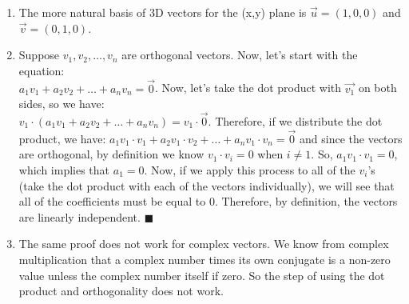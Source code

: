 \documentclass{article}
\newcommand*{\qed}{\hfill\ensuremath{\blacksquare}}
\begin{document}
\begin{enumerate}
\item The more natural basis of 3D vectors for the (x,y) plane is $\overrightarrow{u} = (1, 0, 0)$ and $\overrightarrow{v} = (0, 1, 0)$. 

\item Suppose $v_1, v_2, \dots, v_n$ are orthogonal vectors. Now, let's start with the equation:\\
$a_1v_1 + a_2v_2 + \dots + a_nv_n = \overrightarrow{0}$. Now, let's take the dot product with $\overrightarrow{v_1}$ on both sides, so we have:\\
$v_1 \cdot (a_1v_1 + a_2v_2 + \dots + a_nv_n) = v_1 \cdot \overrightarrow{0}$. Therefore, if we distribute the dot product, we have:
$a_1v_1 \cdot v_1 + a_2v_1 \cdot v_2 + \dots + a_nv_1 \cdot v_n = \overrightarrow{0}$
and since the vectors are orthogonal, by definition we know $v_1 \cdot v_i = 0$ when $i \neq 1$. So, $a_1 v_1 \cdot v_1 = 0$, which implies that $a_1 = 0$. Now, if we apply this process to all of the $v_i$'s (take the dot product with each of the vectors individually), we will see that all of the coefficients must be equal to 0. Therefore, by definition, the vectors are linearly independent. \qed

\item The same proof does not work for complex vectors. We know from complex multiplication that a complex number times its own conjugate is a non-zero value unless the complex number itself if zero. So the step of using the dot product and orthogonality does not work. 

\end{enumerate}
\end{document}
